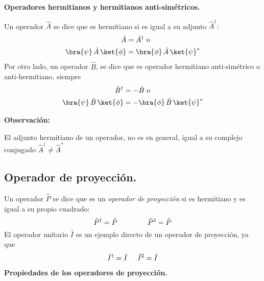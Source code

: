 \textbf{Operadores hermitianos y hermitianos anti-simétricos.}

Un operador $\hat{A}$ se dice que es hermitiano si es igual a su adjunto $\hat{A}^{\dagger}$:
\begin{align}
\begin{aligned}
\hat{A} &= \hat{A}^{\dagger}  \mbox{ o } \\
\bra{\psi} \, \hat{A} \, \ket{\phi} &= \bra{\phi} \, \hat{A} \, \ket{\psi}^{*}
\end{aligned}
\label{eq:ecuacion_02_70}
\end{align}
Por otro lado, un operador $\hat{B}$, se dice que es operador hermitiano anti-simétrico o anti-hermitiano, siempre
\begin{align}
\begin{aligned}
\hat{B}^{\dagger} &= - \hat{B}  \mbox{ o } \\
\bra{\psi} \, \hat{B} \, \ket{\phi} &= - \bra{\phi} \, \hat{B} \, \ket{\psi}^{*}
\end{aligned}
\label{eq:ecuacion_02_71}
\end{align}

\textbf{Observación: }

El adjunto hermitiano de un operador, no es en general, igual a su complejo conjugado $\hat{A}^{\dagger} \neq \hat{A}^{*}$
\subsection{Operador de proyección.}
Un operador $\hat{P}$ se dice que es un \emph{operador de proyección} si es hermitiano y es igual a su propio cuadrado:
\begin{equation}
\hat{P}^{\dagger} = \hat{P} \hspace{1.5cm} \hat{P}^{2} = \hat{P}
\label{eq:ecuacion_02_76}
\end{equation}
El operador unitario $\hat{I}$ es un ejemplo directo de un operador de proyección, ya que 
\begin{align*}
\hat{I}^{\dagger} = \hat{I} \hspace{0.5cm} \hat{I}^{2} = \hat{I}
\end{align*}
\textbf{Propiedades de los operadores de proyección.}

